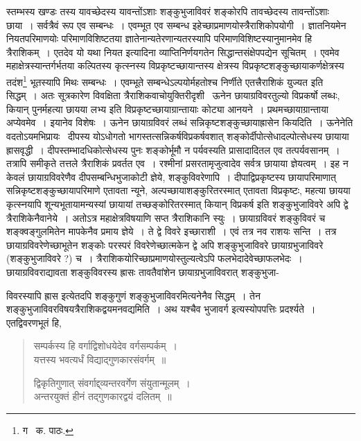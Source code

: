 \documentclass[11pt, openany]{book}
\begin{document}
\noindent स्तम्भस्य खण्डः तस्य यावच्छेदस्य यावन्तोंऽशाः शङ्कुभुजाविवरं शङ्कोरपि तावच्छेदस्य तावन्तोंऽशाः छाया~। सर्वत्रैवं रूप एव सम्बन्धः~। एवम्भूत एव सम्बन्ध इहेच्छाप्रमाणयोस्त्रैराशिकोपयोगी~। ज्ञातनियमेन नियतपरिमाणयोः परिमाणविशिष्टतया ज्ञातेनान्यतेरणान्यतरस्यापि परिमाणविशिष्टस्यानुमानमेव हि त्रैराशिकम्~। एतदेव यो यथा नियत इत्यादिना व्याप्तिनिर्णयगतेन सिद्धान्तसंक्षेपपद्येन सूचितम्~। एवमेव महाक्षेत्रस्यान्तर्गर्भतया कल्पितस्य कृत्स्नस्य विप्रकृष्टच्छायान्तस्य क्षेत्रस्य विप्रकृष्टशङ्कुच्छायाकर्णक्षेत्रस्य तदंश\renewcommand{\thefootnote}{१}\footnote{ग \textendash\ क. पाठः.} भूतस्यापि मिथः सम्बन्धः~। एवम्भूते सम्बन्धेऽल्पयोर्महतोश्च निर्णीते एतत्त्रैराशिकं युज्यत इति सिद्धम्~। अतः सूत्रकारेण विवक्षिता त्रैराशिकवाचोयुक्तिरीदृशी \textendash\ ऊनेन छायाग्रविवरतुल्यो विप्रकर्षो लब्धः, कियान् पुनर्महत्या छायया लभ्य इति विप्रकृष्टच्छायाग्रान्तायाः कोट्या आनयने~। प्रथमच्छायाग्रान्ताया अप्येवमेव~। इयानेव विशेषः~। ऊनेन छायाग्रविवरं लब्धं सन्निकृष्टशङ्कुच्छायाह्रासेन कियदिति~। ऊनेनेति वदतोऽयमभिप्रायः \textendash\ दीपस्य योऽधोगतो भागस्तत्सन्निकर्षविप्रकर्षवशात् शङ्कोर्दीपोत्सेधादल्पोत्सेधस्य छायाया ह्रासवृद्धी~। दीपस्तम्भादधिकोत्सेधस्य पुनः शङ्कोर्भूमौ न पर्यवस्यति प्रासादादितल एव तत्पर्यवसानम्~। तत्रापि समीकृते तत्तले त्रैराशिकं प्रवर्तत एव~। रश्मीनां प्रसरतामृजुत्वादेव सर्वत्र छायाया ज्ञेयत्वम्~।
इह न केवलं छायाग्रविवरेणैव दीपसम्बन्धिभुजाकोटी ज्ञेये, शङ्कुविवरेणापि~। दीपाद्विप्रकृष्टस्य छायापरिमाणात् सन्निकृष्टशङ्कुच्छायापरिमाणे एतावता
न्यूने, अल्पच्छायाशङ्कुरितरस्मात् एतावता विप्रकृष्टः, महत्या छायया कृत्स्नयापि शून्यभूतायामन्यस्यां छायायां तच्छङ्कोरितरस्मात् कियान् विप्रकर्ष इति शङ्कुभुजाविवरे अपि द्वे त्रैराशिकेनैवानेये~। अतोऽत्र महाक्षेत्रविषयाणि सप्त त्रैराशिकानि स्युः~। छायाग्रविवरं शङ्कुविवरं च शङ्क्वङ्गुलमितेन मापकेनैव प्रमाय ज्ञेये~। ते द्वे विवरे इच्छाराशी~। एवं तत्र नव राशयः सन्ति~। तत्र छायाग्रविवरेणेच्छाभूतेन शङ्कोः परस्परं विवरेणेच्छात्मकेन
द्वे अपि शङ्कुभुजाविवरे छायाग्रभुजाविवरे (शङ्कुभुजाविवरे ?) च~। त्रैराशिकयोरिच्छाप्रमाणयोस्तुल्यत्वेऽपि फलभेदादेवेच्छाफलभेदः~। छायाग्रविवराद्यावता शङ्कुविवरस्य ह्रासः तावतैवांशेन छायाग्रभुजाविवरात् शङ्कुभुजा-

\newpage

\noindent विवरस्यापि ह्रास इत्येतदपि {\qt शङ्कुगुणं शङ्कुभुजाविवरमि}त्यनेनैव सिद्धम्~। तेन शङ्कुभुजाविवरविषयत्रैराशिकद्वयमनवद्यमिति~। अथ {\qt यश्चैव भुजावर्ग} इत्यस्योपपत्तिः प्रदर्श्यते~। एतद्विवरणभूतं हि,

\begin{quote}
{\qt सम्पर्कस्य हि वर्गाद्विशोधयेदेव वर्गसम्पर्कम्~।\\
यत्तस्य भवत्यर्धं विद्याद्गुणकारसंवर्गम्~॥

द्विकृतिगुणात् संवर्गाद्द्व्यन्तरवर्गेण संयुतान्मूलम्~।\\
अन्तरयुक्तं हीनं तद्गुणकारद्वयं दलितम्~॥}
\end{quote}
\end{document}
